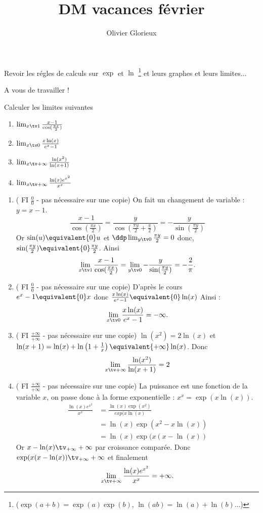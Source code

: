 \documentclass[a4paper, 11pt,reqno]{article}
\author{Olivier Glorieux}
\begin{document}
\title{DM vacances février  
}
\begin{exercice}
Revoir les régles de calculs sur $\exp$  et $\ln$ 
\footnote{($\exp(a+b)= \exp(a)\exp(b)$, $\ln(ab)=\ln(a)+\ln(b)$...) } et leurs graphes et leurs limites...
\end{exercice}
\begin{correction}
A vous de travailler ! 
\end{correction}


\begin{exercice}
Calculer les limites suivantes 
\begin{enumerate}
\item $\lim_{x\tv 1} \frac{x-1}{\cos(\frac{\pi x}{2})}$
\item $\lim_{x\tv 0} \frac{x\ln(x)}{e^x-1}$
\item $\lim_{x\tv +\infty} \frac{\ln(x^2)}{\ln(x+1)}$
\item $\lim_{x\tv +\infty} \frac{\ln(x) e^{x^2}}{x^x}$
\end{enumerate}
\end{exercice}


\begin{correction}
\begin{enumerate}
\item  ( FI $\frac{0}{0}$ - pas nécessaire sur une copie) 
On fait un changement de variable : $y=x-1$.
$$\frac{x-1}{\cos(\frac{\pi x}{2})} = \frac{y}{\cos(\frac{\pi y}{2}+\frac{\pi}{2})}=-\frac{y}{\sin(\frac{\pi y}{2})}$$
Or $\sin(u)\equivalent{0} u$ et $\ddp \lim_{y \tv 0} \frac{\pi y}{2} =0$ donc,  $\sin(\frac{\pi y}{2})\equivalent{0} \frac{\pi y}{2}$. Ainsi 
$$\lim_{x\tv 1} \frac{x-1}{\cos(\frac{\pi x}{2})} = \lim_{y\tv 0} -\frac{y}{\sin(\frac{\pi y}{2})}= -\frac{2}{\pi}.$$
\item  ( FI $\frac{0}{0}$ - pas nécessaire sur une copie) 
D'après le cours $e^x-1\equivalent{0}x$ donc $ \frac{x\ln(x)}{e^x-1} \equivalent{0} \ln(x)$
Ainsi : $$\lim_{x\tv 0} \frac{x\ln(x)}{e^x-1}=-\infty.$$
\item  ( FI $\frac{+\infty}{+\infty}$ - pas nécessaire sur une copie) 
$\ln(x^2)= 2\ln(x)$ et  $\ln(x+1) = \ln(x) + \ln\left( 1+\frac{1}{x}\right)\equivalent{+\infty }\ln(x)$. Donc 
$$\lim_{x\tv +\infty} \frac{\ln(x^2)}{\ln(x+1)}=2$$
\item  ( FI $\frac{+\infty}{+\infty}$ - pas nécessaire sur une copie) 
La puissance est une fonction de la variable $x$, on passe donc à la forme exponentielle : $x^x =\exp(x\ln(x))$.
\begin{align*}
\frac{\ln(x) e^{x^2}}{x^x }&= \frac{\ln(x) \exp(x^2)}{exp(x\ln(x)} \\
&= \ln(x) \exp(x^2-x\ln(x))\\ 
&=\ln(x) \exp(x(x-\ln(x))
\end{align*}
Or $x-\ln(x) \tv_{+\infty} +\infty$ par croissance comparée. Donc $\exp(x(x-\ln(x))\tv_{+\infty} +\infty$  et finalement 
$$\lim_{x\tv +\infty} \frac{\ln(x) e^{x^2}}{x^x} =+\infty.$$

\end{enumerate}

\end{correction}
\end{document}
